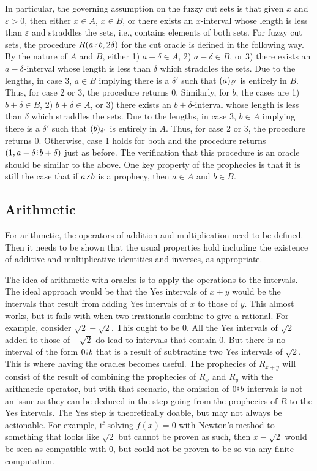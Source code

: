 \documentclass[12pt]{article}
\begin{document}
In particular, the governing assumption on the fuzzy cut sets is that given $x$ and $\varepsilon >0$, then either $x \in A$, $x \in B$, or there exists an $x$-interval whose length is less than $\varepsilon$ and straddles the sets, i.e., contains elements of both sets.  For fuzzy cut sets, the procedure $R(a \lte b, 2\delta)$ for the cut oracle is defined in the following way. By the nature of $A$ and $B$, either 1) $a - \delta \in A$, 2) $a - \delta \in B$, or 3) there exists an $a-\delta$-interval whose length is less than $\delta$ which straddles the sets. Due to the lengths, in case 3, $a \in B$ implying there is a $\delta'$ such that $\halo[\delta']{a}$ is entirely in $B$.  Thus, for case 2 or 3, the procedure returns $0$. Similarly, for $b$, the cases are 1) $b + \delta \in B$, 2) $b+\delta \in A$, or 3) there exists an $b+\delta$-interval whose length is less than $\delta$ which straddles the sets. Due to the lengths, in case 3, $b \in A$ implying there is a $\delta'$ such that $\halo[\delta']{b}$ is entirely in $A$.  Thus, for case 2 or 3, the procedure returns $0$. Otherwise, case 1 holds for both and the procedure returns $(1, a-\delta\rint b+\delta)$ just as before. The verification that this procedure is an oracle should be similar to the above. One key property of the prophecies is that it is still the case that if $a \lte b$ is a prophecy, then $a \in A$ and $b \in B$.


\subsection{Arithmetic}

For arithmetic, the operators of addition and multiplication need to be defined. Then it needs to be shown that the usual properties hold including the existence of additive and multiplicative identities and inverses, as appropriate. 

The idea of arithmetic with oracles is to apply the operations to the intervals. The ideal approach would be that the Yes intervals of $x+y$ would be the intervals that result from adding Yes intervals of $x$ to those of $y$. This almost works, but it fails with when two irrationals combine to give a rational. For example, consider $\sqrt{2} - \sqrt{2}$. This ought to be $0$. All the Yes intervals of $\sqrt{2}$ added to those of $-\sqrt{2}$ do lead to intervals that contain $0$. But there is no interval of the form $0\rint b$ that is a result of subtracting two Yes intervals of $\sqrt{2}$. This is where having the oracles becomes useful. The prophecies of $R_{x+y}$ will consist of the result of combining the prophecies of $R_x$ and $R_y$ with the arithmetic operator, but with that scenario, the omission of $0\rint b$ intervals is not an issue as they can be deduced in the step going from the prophecies of $R$ to the Yes intervals. The Yes step is theoretically doable, but may not always be actionable. For example, if solving $f(x)=0$ with Newton's method to something that looks like $\sqrt{2}$ but cannot be proven as such, then $x - \sqrt{2}$ would be seen as compatible with $0$, but could not be proven to be so via any finite computation. 
\end{document}
